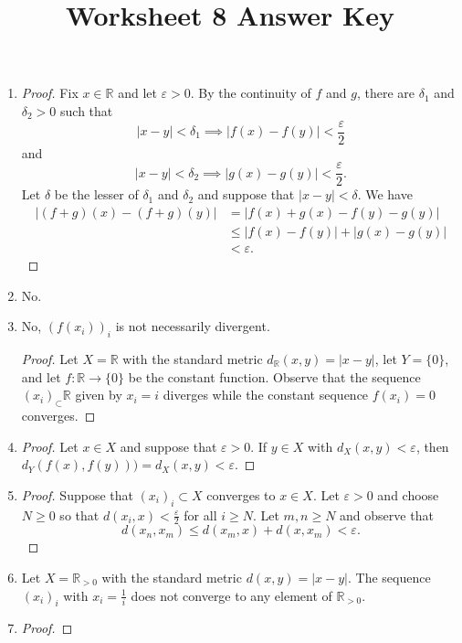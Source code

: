\documentclass{article}
\title{Worksheet 8 Answer Key}
\author{}\date{}
\newcommand{\R}{\mathbb{R}}
\renewcommand{\epsilon}{\varepsilon}
\begin{document}
\maketitle

\begin{enumerate}
	\item 
		\begin{proof}
			Fix $x\in\R$ and let $\epsilon>0$. By the continuity of $f$ and $g$, there are $\delta_1$ and $\delta_2>0$ such that
			\[
				|x-y|<\delta_1 \implies |f(x)-f(y)| < \frac{\epsilon}{2}
			\]
			and
			\[
				|x-y|<\delta_2 \implies |g(x)-g(y)| < \frac{\epsilon}{2}.
			\]
			Let $\delta$ be the lesser of $\delta_1$ and $\delta_2$ and suppose that $|x-y|<\delta$. We have
			\begin{align*}
				|(f+g)(x)-(f+g)(y)|
					&=	|f(x)+g(x)-f(y)-g(y)|			\\
					&\leq	|f(x)-f(y)| + |g(x)-g(y)|		\\
					&<	\epsilon.
			\end{align*}
		\end{proof}
	\item No.
	\item No, $(f(x_i))_i$ is not necessarily divergent.
		\begin{proof}
			Let $X=\R$ with the standard metric $d_\R(x,y)=|x-y|$, let $Y=\{0\}$, and let $f:\R\to\{0\}$ be the constant function. Observe that the sequence $(x_i)_\subset\R$ given by $x_i=i$ diverges while the constant sequence $f(x_i)=0$ converges.
		\end{proof}
	\item 
		\begin{proof}
			Let $x\in X$ and suppose that $\epsilon>0$. If $y\in X$ with $d_X(x,y)<\epsilon$, then $d_Y(f(x),f(y)))=d_X(x,y)<\epsilon$.
		\end{proof}
	\item 
		\begin{proof}
			Suppose that $(x_i)_i\subset X$ converges to $x\in X$. Let $\epsilon>0$ and choose $N\geq 0$ so that $d(x_i,x)<\frac{\epsilon}{2}$ for all $i\geq N$. Let $m,n\geq N$ and observe that
			\[
				d(x_n,x_m) \leq d(x_m,x) + d(x,x_m) < \epsilon.
			\]
		\end{proof}
	\item Let $X=\R_{>0}$ with the standard metric $d(x,y)=|x-y|$. The sequence $(x_i)_i$ with $x_i = \frac{1}{i}$ does not converge to any element of $\R_{>0}$.
	\item 
		\begin{proof}

\end{proof}
\end{enumerate}
\end{document}
